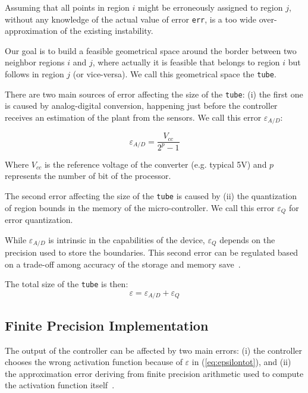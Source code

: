 Assuming that all points in region $i$ might be erroneously assigned to region $j$, without any  knowledge of the actual value of error \texttt{err}, is a too wide over-approximation of the existing instability. 

Our goal is to build a feasible geometrical space around the border between two neighbor regions $i$ and $j$, where actually it is feasible that \statevarmath belongs to region $i$ but \qstatevarmath follows in region $j$ (or vice-versa).
We call this geometrical space the \texttt{tube}.

There are two main sources of error affecting the size of the \texttt{tube}: (i) the first one is caused by analog-digital conversion, happening just before the controller receives an estimation of the plant from the sensors. We call this error $\varepsilon_{A/D}$: 

\begin{equation}\nonumber
\varepsilon_{A/D}=\frac{V_{cc}}{2^{p}-1}
\end{equation}

Where $V_{cc}$ is the reference voltage of the converter (e.g. typical 5V) and $p$ represents the number of bit of the processor.

The second error affecting the size of the \texttt{tube} is caused by (ii) the quantization of region bounds in the memory of the micro-controller. We call this error $\varepsilon_{Q}$ for error quantization.

While $\varepsilon_{A/D}$ is intrinsic in the capabilities of the device, $\varepsilon_{Q}$ depends on the precision used to store the boundaries. This second error can be regulated based on a trade-off among accuracy of the storage and memory save~\cite{memoryMPC}.

The total size of the \texttt{tube} is then:
\begin{equation}\label{eq:epsilontot}
\varepsilon=\varepsilon_{A/D}+\varepsilon_{Q}
\end{equation}
\subsection{Finite Precision Implementation}
The output of the controller can be affected by two main errors: (i) the controller chooses the wrong activation function because of $\varepsilon$ in (\ref{eq:epsilontot}), and (ii) the approximation error deriving from finite precision arithmetic used to compute the activation function itself~\cite{imperialrmpc}.

